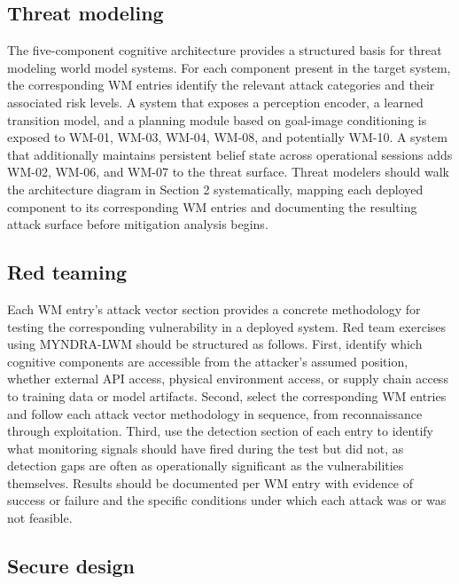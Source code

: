 \documentclass[11pt,a4paper]{article}
\begin{document}
\subsection{Threat modeling}

The five-component cognitive architecture provides a structured basis for threat modeling world model systems. For each component present in the target system, the corresponding WM entries identify the relevant attack categories and their associated risk levels. A system that exposes a perception encoder, a learned transition model, and a planning module based on goal-image conditioning is exposed to WM-01, WM-03, WM-04, WM-08, and potentially WM-10. A system that additionally maintains persistent belief state across operational sessions adds WM-02, WM-06, and WM-07 to the threat surface. Threat modelers should walk the architecture diagram in Section 2 systematically, mapping each deployed component to its corresponding WM entries and documenting the resulting attack surface before mitigation analysis begins.

\subsection{Red teaming}

Each WM entry's attack vector section provides a concrete methodology for testing the corresponding vulnerability in a deployed system. Red team exercises using MYNDRA-LWM should be structured as follows. First, identify which cognitive components are accessible from the attacker's assumed position, whether external API access, physical environment access, or supply chain access to training data or model artifacts. Second, select the corresponding WM entries and follow each attack vector methodology in sequence, from reconnaissance through exploitation. Third, use the detection section of each entry to identify what monitoring signals should have fired during the test but did not, as detection gaps are often as operationally significant as the vulnerabilities themselves. Results should be documented per WM entry with evidence of success or failure and the specific conditions under which each attack was or was not feasible.

\subsection{Secure design}
\end{document}
